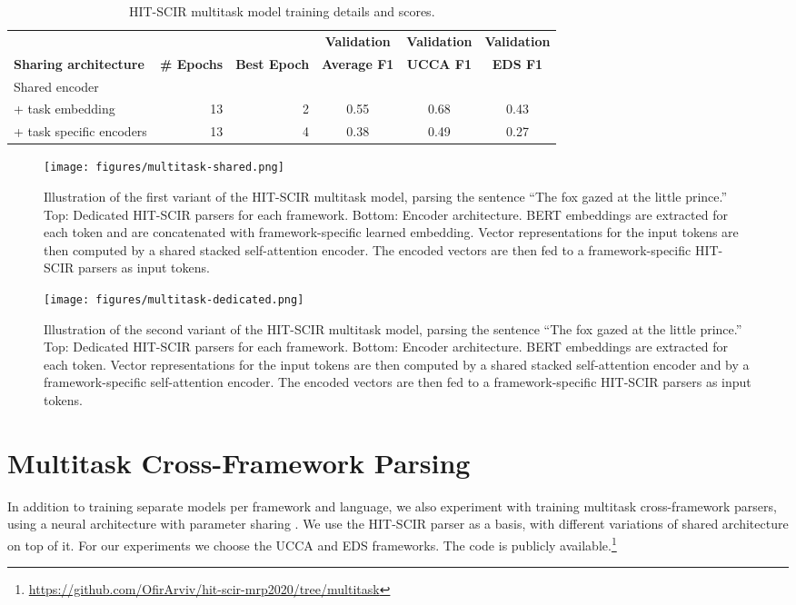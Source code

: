\documentclass[11pt,a4paper]{article}
\begin{document}
\begin{table*}[th]
\centering
\begin{tabular}{lrrccc}
&&&\textbf{Validation}&\textbf{Validation}&\textbf{Validation}\\
\textbf{Sharing architecture} &
  \textbf{\# Epochs} &
  \textbf{Best Epoch} &
  \textbf{Average F1} &
  \textbf{UCCA F1} &
  \textbf{EDS F1} \\ \hline
Shared encoder \\ + task embedding &
  13 &
  2 &
  0.55 &
  0.68 &
  0.43 \\ + task specific encoders &
  13 &
  4 &
  0.38 &
  0.49 &
  0.27
\end{tabular}
\caption{HIT-SCIR multitask model training details and scores.}
\label{tab:Multitask_score}
\end{table*}

\begin{figure*}[th]
   \centering\texttt{[image: figures/multitask-shared.png]}
\caption{Illustration of the first variant of the HIT-SCIR multitask model,
parsing the sentence
``The fox gazed at the little prince.''
Top: Dedicated HIT-SCIR parsers for each framework.
		Bottom: Encoder architecture.
		BERT embeddings are extracted for each token and are concatenated with framework-specific learned embedding.
		Vector representations for the input tokens are then computed
		by a shared stacked self-attention encoder.
		The encoded vectors are then fed to a framework-specific HIT-SCIR parsers as input tokens.
}\label{fig:hit_scir_multitask_model_1}
\end{figure*}

\begin{figure*}[th]
   \centering\texttt{[image: figures/multitask-dedicated.png]}
\caption{Illustration of the second variant of the HIT-SCIR multitask model,
parsing the sentence
``The fox gazed at the little prince.''
Top: Dedicated HIT-SCIR parsers for each framework.
		Bottom:  Encoder architecture.
		BERT embeddings are extracted for each token. Vector representations for the input tokens are then computed by a shared stacked self-attention encoder and by a framework-specific self-attention encoder.
		The encoded vectors are then fed to a framework-specific HIT-SCIR parsers as input tokens.
}\label{fig:hit_scir_multitask_model_2}
\end{figure*}

\section{Multitask Cross-Framework Parsing}\label{sec:multitask}
In addition to training separate models per framework and language, we also experiment with training multitask cross-framework parsers, using a neural architecture with parameter sharing \cite{peng-etal-2017-deep,Peng-EtAl:2018:NAACL,Her:Abe:Rap:18,lindemann-etal-2019-compositional,hershcovich-arviv-2019-tupa}.
We use the HIT-SCIR parser as a basis, with different variations of shared architecture on top of it. For our experiments we choose the UCCA and EDS frameworks. The code is publicly available.\footnote{\url{https://github.com/OfirArviv/hit-scir-mrp2020/tree/multitask}}
\end{document}
